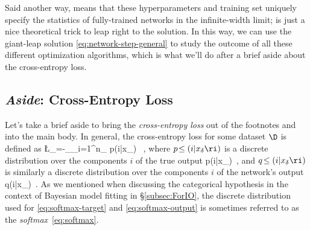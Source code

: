 Said another way,  means that these hyperparameters and training set uniquely specify the statistics of fully-trained networks in the infinite-width limit;  is just a nice theoretical trick to leap right to the solution.
In this way, we can use the giant-leap solution \eqref{eq:network-step-general} to study the outcome of all these different optimization algorithms, which is what we'll do after a brief aside about the cross-entropy loss.





\subsection{\emph{Aside}: Cross-Entropy Loss}\label{subsec:cross-entropy}
Let's take a brief aside to bring the \emph{cross-entropy loss} out of the footnotes and into the main body. In general, the cross-entropy loss for some dataset $\D$ is defined as
\be\label{eq:loss-cross-entropy}
\L_{\D}=-\sum_{\delta\in\D}\sum_{i=1}^{n_} p\!\le(i|x_\delta\ri) \log\!\le[q\!\le(i|x_\delta\ri)\ri] \, ,
\ee
where $p\!\le(i|x_\delta\ri)$ is a discrete distribution over the components $i$ of the true output
\be\label{eq:softmax-target}
p\!\le(i|x_\delta\ri)\equiv {}\, ,
\ee
and $q\!\le(i|x_\delta\ri)$ is similarly a discrete distribution over the components $i$ of the network's output
\be\label{eq:softmax-output}
q\!\le(i|x_\delta\ri)\equiv {}\, .
\ee
As we mentioned when discussing the categorical hypothesis in the context of Bayesian model fitting in \S\ref{subsec:ForIO}, the discrete distribution used for \eqref{eq:softmax-target} and \eqref{eq:softmax-output} is sometimes referred to as the \emph{softmax}~\eqref{eq:softmax}.
